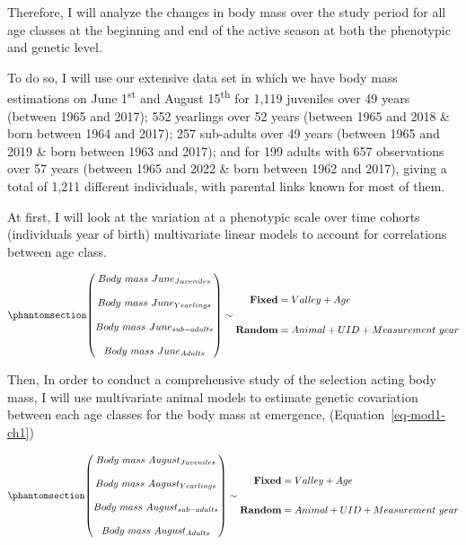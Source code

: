 \documentclass[
  12pt,
  letterpaper,
]{scrartcl}
\begin{document}
Therefore, I will analyze the changes in body mass over the study period
for all age classes at the beginning and end of the active season at
both the phenotypic and genetic level.

To do so, I will use our extensive data set in which we have body mass
estimations on June 1\textsuperscript{st} and August
15\textsuperscript{th} for 1,119 juveniles over 49 years (between 1965
and 2017); 552 yearlings over 52 years (between 1965 and 2018 \& born
between 1964 and 2017); 257 sub-adults over 49 years (between 1965 and
2019 \& born between 1963 and 2017); and for 199 adults with 657
observations over 57 years (between 1965 and 2022 \& born between 1962
and 2017), giving a total of 1,211 different individuals, with parental
links known for most of them.

At first, I will look at the variation at a phenotypic scale over time
cohorts (individuals year of birth) multivariate linear models to
account for correlations between age class.

\begin{equation}\phantomsection\label{eq-mod1-ch1}{
\begin{pmatrix}
Body\ mass\ June_{Juveniles} \\
\\
Body\ mass\ June_{Yearlings} \\
\\
Body\ mass\ June_{sub-adults} \\
\\
Body\ mass\ June_{Adults}
\end{pmatrix}
\sim
\begin{aligned}
\textbf{Fixed} &= Valley + Age \\
\\
\textbf{Random} &= Animal + UID + Measurement\ year
\end{aligned}
}\end{equation}

Then, In order to conduct a comprehensive study of the selection acting
body mass, I will use multivariate animal models to estimate genetic
covariation between each age classes for the body mass at emergence,
(Equation~\ref{eq-mod1-ch1})

\begin{equation}\phantomsection\label{eq-mod2-ch1}{
\begin{pmatrix}
Body\ mass\ August_{Juveniles} \\
\\
Body\ mass\ August_{Yearlings} \\
\\
Body\ mass\ August_{sub-adults} \\
\\
Body\ mass\ August_{Adults}
\end{pmatrix}
\sim
\begin{aligned}
\textbf{Fixed} &= Valley + Age \\
\\
\textbf{Random} &= Animal + UID + Measurement\ year
\end{aligned}
}\end{equation}
\end{document}
